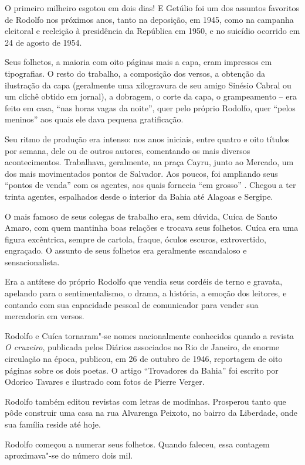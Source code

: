  O primeiro milheiro esgotou em dois dias! E Getúlio foi um dos assuntos
favoritos de Rodolfo nos próximos anos, tanto na deposição, em 1945,
como na campanha eleitoral e reeleição à presidência da República em
1950, e no suicídio ocorrido em 24 de agosto de 1954. 

 Seus folhetos, a maioria com oito páginas mais a capa, eram impressos
em tipografias. O resto do trabalho, a composição dos versos, a
obtenção da ilustração da capa (geralmente uma xilogravura de seu amigo
Sinésio Cabral ou um clichê obtido em jornal), a dobragem, o corte da
capa, o grampeamento -- era feito em casa, ``nas horas
vagas da noite'', quer pelo próprio Rodolfo, quer
``pelos meninos'' aos quais ele dava pequena
gratificação. 

 Seu ritmo de produção era intenso: nos anos iniciais, entre quatro e
oito títulos por semana, dele ou de outros autores, comentando os mais
diversos acontecimentos. Trabalhava, geralmente, na praça Cayru, junto
ao Mercado, um dos mais movimentados pontos de Salvador. Aos poucos,
foi ampliando seus ``pontos de venda'' com os
agentes, aos quais fornecia ``em grosso'' .
Chegou a ter trinta agentes, espalhados desde o interior da Bahia até
Alagoas e Sergipe. 

 O mais famoso de seus colegas de trabalho era, sem dúvida, Cuíca de
Santo Amaro, com quem mantinha boas relações e trocava seus folhetos.
Cuíca era uma figura excêntrica, sempre de cartola, fraque, óculos
escuros, extrovertido, engraçado. O assunto de seus folhetos era
geralmente escandaloso e sensacionalista. 

 Era a antítese do próprio Rodolfo que vendia seus cordéis de terno e
gravata, apelando para o sentimentalismo, o drama, a história, a emoção
dos leitores, e contando com sua capacidade pessoal de comunicador para
vender sua mercadoria em versos. 

 Rodolfo e Cuíca tornaram"-se nomes nacionalmente conhecidos quando a
revista \textit{O cruzeiro}, publicada pelos Diários associados no Rio
de Janeiro, de enorme circulação na época, publicou, em 26 de outubro
de 1946, reportagem de oito páginas sobre os dois poetas. O artigo
``Trovadores da Bahia'' foi escrito por
Odorico Tavares e ilustrado com fotos de Pierre Verger. 

 Rodolfo também editou revistas com letras de modinhas. Prosperou tanto
que pôde construir uma casa na rua Alvarenga Peixoto, no bairro da
Liberdade, onde sua família reside até hoje. 

 Rodolfo começou a numerar seus folhetos. Quando faleceu, essa contagem
aproximava"-se do número dois mil. 

